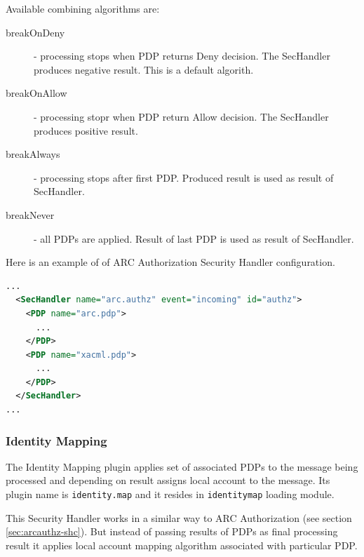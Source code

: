 \documentclass{article}
\begin{document}
Available combining algorithms are:
\begin{description}
\item[breakOnDeny] - processing stops when PDP returns Deny decision. The SecHandler
produces negative result. This is a default algorith.
\item[breakOnAllow] - processing stopr when PDP return Allow decision. The SecHandler
produces positive result.
\item[breakAlways] - processing stops after first PDP. Produced result is used as
result of SecHandler.
\item[breakNever] - all PDPs are applied. Result of last PDP is used as result of 
SecHandler.
\end{description}
Here is an example of of ARC Authorization Security Handler configuration.
\begin{lstlisting}[language=xml]
...
  <SecHandler name="arc.authz" event="incoming" id="authz">
    <PDP name="arc.pdp">
      ...
    </PDP>
    <PDP name="xacml.pdp">
      ...
    </PDP>
  </SecHandler>
...
\end{lstlisting}


\subsubsection{Identity Mapping}\label{sec:identitymap-shc}
The Identity Mapping plugin applies set of associated PDPs to the message
being processed and depending on result assigns local account to the 
message. Its plugin name is \texttt{identity.map} and it resides in 
\texttt{identitymap} loading module.

This Security Handler works in a similar way to ARC Authorization (see
section \ref{sec:arcauthz-shc}). But instead of passing results of PDPs as
final processing result it applies local account mapping algorithm 
associated with particular PDP.
\end{document}
